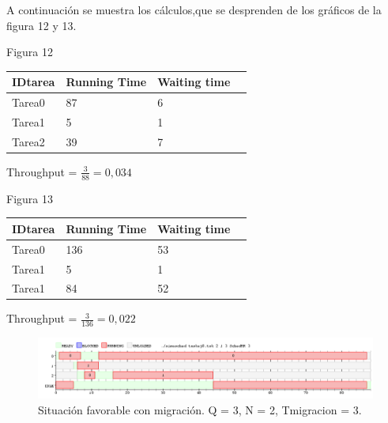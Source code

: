 \documentclass[10pt, a4paper]{article}
\begin{document}
A continuación se muestra los cálculos,que se desprenden de los gráficos de la figura 12 y 13.

\begin{center}
Figura 12
\end{center}

\begin{center}
\begin{tabular}{| l | l | l | l |}
    \hline
    IDtarea &  Running Time & Waiting time\\ \hline
    Tarea0 & 	87 & 6  \\ \hline
    Tarea1 & 	5 & 1 \\ \hline
    Tarea2 &	39 & 7 \\ \hline
    
   
\end{tabular}
\end{center}
\begin{center}
Throughput = $\frac{3}{88} = 0,034$
\end{center}
\begin{center}
Figura 13
\end{center}

\begin{center}
\begin{tabular}{| l | l | l | l |}
    \hline
    IDtarea &  Running Time & Waiting time \\ \hline
    Tarea0 & 	 136 & 53 \\ \hline
    Tarea1 & 	5 & 1 \\ \hline
    Tarea1 &	84 & 52 \\ \hline
   
\end{tabular}
\end{center}

\begin{center}
Throughput = $\frac{3}{136} = 0,022$
\end{center}

\begin{figure}[H]
  	\centering
   	\includegraphics[width=1\textwidth]
   	 {imgs/8Migracion1.png}
	\caption{Situación favorable con migración. Q = 3, N = 2, Tmigracion = 3.}
\end{figure}
\end{document}
